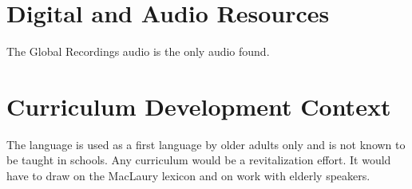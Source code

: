 \documentclass[12pt]{article}
\begin{document}
\section{Digital and Audio Resources}
The Global Recordings audio is the only audio found.

\section{Curriculum Development Context}
The language is used as a first language by older adults only and is not known to be taught in schools. Any curriculum would be a revitalization effort. It would have to draw on the MacLaury lexicon and on work with elderly speakers.
\end{document}
